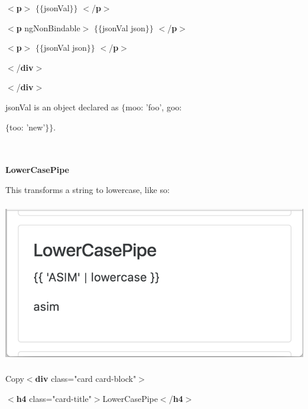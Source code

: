 \documentclass{article}
\begin{document}
$\mathrm{<}$\textbf{p}$\mathrm{>}$ $\mathrm{\{}$$\mathrm{\{}$jsonVal$\mathrm{\}}$$\mathrm{\}}$ $\mathrm{<}$/\textbf{p}$\mathrm{>}$

$\mathrm{<}$\textbf{p} ngNonBindable$\mathrm{>}$ $\mathrm{\{}$$\mathrm{\{}$jsonVal {\textbar} json$\mathrm{\}}$$\mathrm{\}}$ $\mathrm{<}$/\textbf{p}$\mathrm{>}$

$\mathrm{<}$\textbf{p}$\mathrm{>}$ $\mathrm{\{}$$\mathrm{\{}$jsonVal {\textbar} json$\mathrm{\}}$$\mathrm{\}}$ $\mathrm{<}$/\textbf{p}$\mathrm{>}$

$\mathrm{<}$/\textbf{div}$\mathrm{>}$

\noindent $\mathrm{<}$/\textbf{div}$\mathrm{>}$

\noindent 

\noindent jsonVal is an object declared as $\mathrm{\{}$moo: 'foo', goo:

\noindent $\mathrm{\{}$too: 'new'$\mathrm{\}}$$\mathrm{\}}$.

\noindent  

\noindent 
\\ \\ 
\newpage
{\large \noindent \textbf{LowerCasePipe}}

\noindent \textbf{}

\noindent This transforms a string to lowercase, like so:

\begin{center}
	\noindent \includegraphics*[width=5.61in, height=2.79in]{IMG-03-05}
\end{center}

\noindent 

\noindent Copy$\mathrm{<}$\textbf{div} class="card card-block"$\mathrm{>}$

$\mathrm{<}$\textbf{h4} class="card-title"$\mathrm{>}$LowerCasePipe$\mathrm{<}$/\textbf{h4}$\mathrm{>}$
\end{document}
